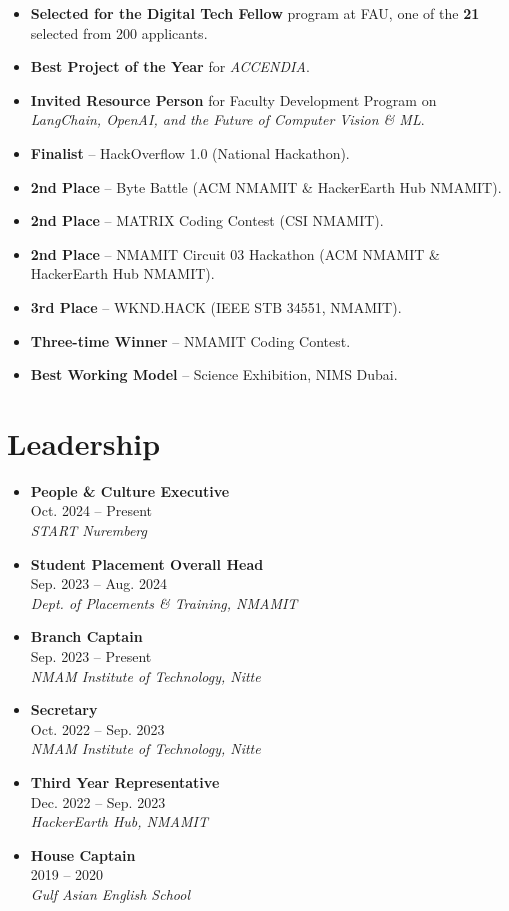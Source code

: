 \documentclass[a4paper,11pt]{article}
\newcommand{\resumeLeadership}[3]{
  \item
      \textbf{#1}\\#2 \\
      \textit{\small#3}\\

}
\begin{document}
\small{

\begin{itemize}
    \item{\textbf{Selected for the Digital Tech Fellow} program at FAU, one of the \textbf{21} selected from 200 applicants.}
    \item \textbf{Best Project of the Year} for \textit{ACCENDIA}.
    \item \textbf{Invited Resource Person} for Faculty Development Program on \textit{LangChain, OpenAI, and the Future of Computer Vision \& ML}.
    \item \textbf{Finalist} – HackOverflow 1.0 (National Hackathon).
    \item \textbf{2nd Place} – Byte Battle (ACM NMAMIT \& HackerEarth Hub NMAMIT).
    \item \textbf{2nd Place} – MATRIX Coding Contest (CSI NMAMIT).
    \item \textbf{2nd Place} – NMAMIT Circuit 03 Hackathon (ACM NMAMIT \& HackerEarth Hub NMAMIT).
    \item \textbf{3rd Place} – WKND.HACK (IEEE STB 34551, NMAMIT).
    \item \textbf{Three-time Winner} – NMAMIT Coding Contest.
    \item \textbf{Best Working Model} – Science Exhibition, NIMS Dubai.
\end{itemize}

}

\vspace{1mm}


\section{Leadership}

\vspace{-10pt}

\begin{multicols}{2}
    \begin{itemize}
        \resumeLeadership{People \& Culture Executive}{Oct. 2024 -- Present}{START Nuremberg}
        \resumeLeadership{Student Placement Overall Head}{Sep. 2023 -- Aug. 2024}{Dept. of Placements \& Training, NMAMIT}
        \resumeLeadership{Branch Captain}{Sep. 2023 -- Present}{NMAM Institute of Technology, Nitte}
        \resumeLeadership{Secretary}{Oct. 2022 -- Sep. 2023}{NMAM Institute of Technology, Nitte}
        \resumeLeadership{Third Year Representative}{Dec. 2022 -- Sep. 2023}{HackerEarth Hub, NMAMIT}
        \resumeLeadership{House Captain}{2019 -- 2020}{Gulf Asian English School}
    \end{itemize}
\end{multicols}
\end{document}

